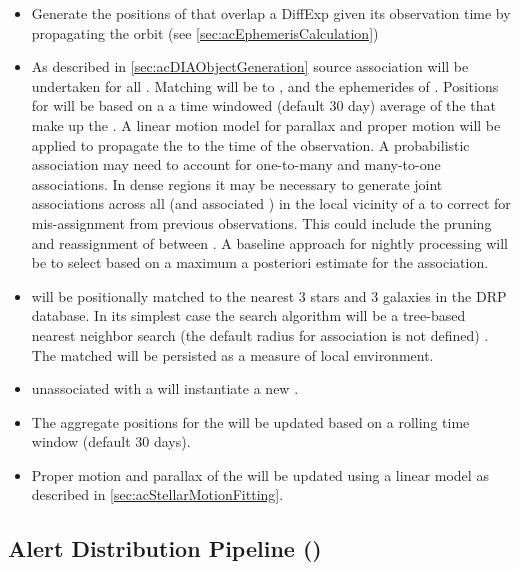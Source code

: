 \begin{itemize}
\item Generate the positions of \SSObjects that overlap a DiffExp given its observation time by propagating the \SSObject orbit (see \ref{sec:acEphemerisCalculation})
\item As described in \ref{sec:acDIAObjectGeneration} source association will be undertaken for all \DIASources. Matching will be to \DIAObjects, and the ephemerides of \SSObjects. Positions for \DIAObjects will be based on a a time windowed (default 30 day) average of the \DIASources that make up the \DIAObject. A linear motion model for parallax and proper motion will be applied to propagate the \DIAObject to the time of the observation. A probabilistic association may need to account for one-to-many and many-to-one associations.  In dense regions it may be necessary to generate joint associations across all \DIAObjects (and associated \DIASources) in the local  vicinity of a \DIASource to correct for mis-assignment from previous observations. This could include the pruning and reassignment of \DIASources between \DIAObjects. A baseline approach for nightly processing will be to select based on a maximum a posteriori estimate for the association.
\item \DIASources will be positionally matched to the nearest 3 stars and 3 galaxies in the DRP \Object database. In its simplest case the search algorithm will be a tree-based nearest neighbor search (the default radius for association is not defined) . The matched \Objects will be persisted as a measure of local environment.
\item \DIASources unassociated with a \DIAObject will instantiate a new \DIAObject.
\item The aggregate positions for the \DIAObjects will be updated based on a rolling time window (default 30 days).
\item Proper motion and parallax of the \DIAObject will be updated using a linear model as described in \ref{sec:acStellarMotionFitting}.
\end{itemize}


\clearpage

\subsection{Alert Distribution Pipeline (\wbsAP)}

